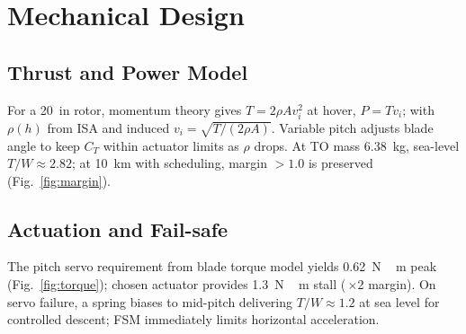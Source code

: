 \documentclass[conference]{IEEEtran}
\begin{document}
\section{Mechanical Design}
\subsection{Thrust and Power Model}
For a 20~in rotor, momentum theory gives
$T=2\rho A v_i^2$ at hover, $P=T v_i$; with $\rho(h)$ from ISA and induced $v_i=\sqrt{T/(2\rho A)}$.
Variable pitch adjusts blade angle to keep $C_T$ within actuator limits as $\rho$ drops. At TO mass \SI{6.38}{kg}, sea-level $T/W\approx 2.82$; at 10~km with scheduling, margin $>\!1.0$ is preserved (Fig.~\ref{fig:margin}).

\subsection{Actuation and Fail-safe}
The pitch servo requirement from blade torque model yields \SI{0.62}{N\,m} peak (Fig.~\ref{fig:torque}); chosen actuator provides \SI{1.3}{N\,m} stall (\,$\times$2 margin). On servo failure, a spring biases to mid-pitch delivering $T/W\approx 1.2$ at sea level for controlled descent; FSM immediately limits horizontal acceleration.
\end{document}
